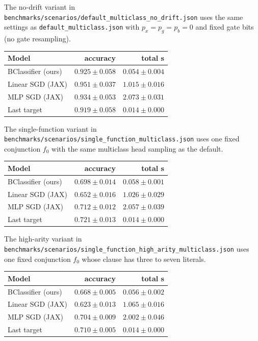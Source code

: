 \documentclass[11pt]{article}
\begin{document}
The no-drift variant in
\texttt{benchmarks/scenarios/default\_multiclass\_no\_drift.json} uses the
same settings as \texttt{default\_multiclass.json} with $p_x=p_g=p_b=0$ and
fixed gate bits (no gate resampling).

\begin{center}
\footnotesize
\begin{tabular}{lrr}
\hline
\textbf{Model} & accuracy & total s \\
\hline
BClassifier (ours) & $0.925\pm0.058$ & $0.054\pm0.004$ \\
Linear SGD (JAX) & $0.951\pm0.037$ & $1.015\pm0.016$ \\
MLP SGD (JAX) & $0.934\pm0.053$ & $2.073\pm0.031$ \\
Last target & $0.919\pm0.058$ & $0.014\pm0.000$ \\
\hline
\end{tabular}
\end{center}

The single-function variant in
\texttt{benchmarks/scenarios/single\_function\_multiclass.json} uses one fixed
conjunction $f_0$ with the same multiclass head sampling as the default.

\begin{center}
\footnotesize
\begin{tabular}{lrr}
\hline
\textbf{Model} & accuracy & total s \\
\hline
BClassifier (ours) & $0.698\pm0.014$ & $0.058\pm0.001$ \\
Linear SGD (JAX) & $0.652\pm0.016$ & $1.026\pm0.029$ \\
MLP SGD (JAX) & $0.712\pm0.012$ & $2.057\pm0.039$ \\
Last target & $0.721\pm0.013$ & $0.014\pm0.000$ \\
\hline
\end{tabular}
\end{center}

The high-arity variant in
\texttt{benchmarks/scenarios/single\_function\_high\_arity\_multiclass.json}
uses one fixed conjunction $f_0$ whose clause has three to seven literals.

\begin{center}
\footnotesize
\begin{tabular}{lrr}
\hline
\textbf{Model} & accuracy & total s \\
\hline
BClassifier (ours) & $0.668\pm0.005$ & $0.056\pm0.002$ \\
Linear SGD (JAX) & $0.623\pm0.013$ & $1.065\pm0.016$ \\
MLP SGD (JAX) & $0.704\pm0.009$ & $2.002\pm0.046$ \\
Last target & $0.710\pm0.005$ & $0.014\pm0.000$ \\
\hline
\end{tabular}
\end{center}
\end{document}
